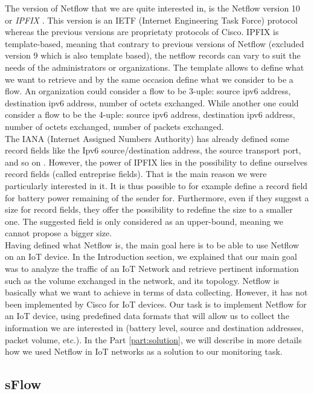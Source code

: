 The version of Netflow that we are quite interested in, is the Netflow version 10 or \textit{IPFIX} \cite{claise2013rfc}. This version is an IETF (Internet Engineering Task Force) protocol whereas the previous versions are proprietaty protocols of Cisco. IPFIX is template-based, meaning that contrary to previous versions of Netflow (excluded version 9 which is also template based), the netflow records can vary to suit the needs of the administrators or organizations. The template allows to define what we want to retrieve and by the same occasion define what we consider to be a flow. An organization could consider a flow to be 3-uple: source ipv6 address, destination ipv6 address, number of octets exchanged. While another one could consider a flow to be the 4-uple: source ipv6 address, destination ipv6 address, number of octets exchanged, number of packets exchanged. \\

The IANA (Internet Assigned Numbers Authority) has already defined some record fields like the Ipv6 source/destination address, the source transport port, and so on \cite{website:ipfix_entities}. However, the power of IPFIX lies in the possibility to define ourselves record fields (called entreprise fields). That is the main reason we were particularly interested in it. It is thus possible to for example define a record field for battery power remaining of the sender for. Furthermore, even if they suggest a size for record fields, they offer the possibility to redefine the size to a smaller one. The suggested field is only considered as an upper-bound, meaning we cannot propose a bigger size.\\

Having defined what Netflow is, the main goal here is to be able to use Netflow on an IoT device. In the Introduction section, we explained that our main goal was to analyze the traffic of an IoT Network and retrieve pertinent information such as the volume exchanged in the network, and its topology. Netflow is basically what we want to achieve in terms of data collecting. However, it has not been implemented by Cisco for IoT devices. Our task is to implement Netflow for an IoT device, using predefined data formats that will allow us to collect the information we are interested in (battery level, source and destination addresses, packet volume, etc.). In the Part \ref{part:solution}, we will describe in more details how we used Netflow in IoT networks as a solution to our monitoring task.

\subsection{sFlow}

